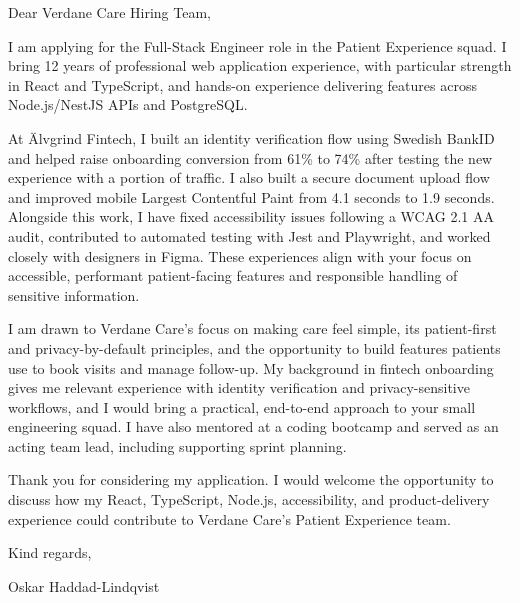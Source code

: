 \documentclass[11pt,a4paper]{article}
\begin{document}
Dear Verdane Care Hiring Team,

I am applying for the Full-Stack Engineer role in the Patient Experience squad. I bring 12 years of professional web application experience, with particular strength in React and TypeScript, and hands-on experience delivering features across Node.js/NestJS APIs and PostgreSQL.

At Älvgrind Fintech, I built an identity verification flow using Swedish BankID and helped raise onboarding conversion from 61\% to 74\% after testing the new experience with a portion of traffic. I also built a secure document upload flow and improved mobile Largest Contentful Paint from 4.1 seconds to 1.9 seconds. Alongside this work, I have fixed accessibility issues following a WCAG 2.1 AA audit, contributed to automated testing with Jest and Playwright, and worked closely with designers in Figma. These experiences align with your focus on accessible, performant patient-facing features and responsible handling of sensitive information.

I am drawn to Verdane Care’s focus on making care feel simple, its patient-first and privacy-by-default principles, and the opportunity to build features patients use to book visits and manage follow-up. My background in fintech onboarding gives me relevant experience with identity verification and privacy-sensitive workflows, and I would bring a practical, end-to-end approach to your small engineering squad. I have also mentored at a coding bootcamp and served as an acting team lead, including supporting sprint planning.

Thank you for considering my application. I would welcome the opportunity to discuss how my React, TypeScript, Node.js, accessibility, and product-delivery experience could contribute to Verdane Care’s Patient Experience team.

Kind regards,

Oskar Haddad-Lindqvist
\end{document}
